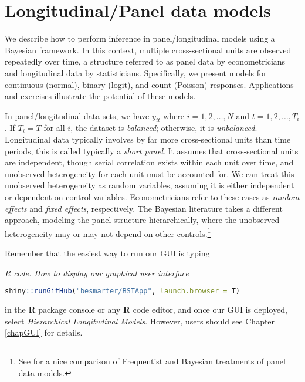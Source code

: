 \chapter{Longitudinal/Panel data models}\label{chap9}

We describe how to perform inference in panel/longitudinal models using a Bayesian framework. In this context, multiple cross-sectional units are observed repeatedly over time, a structure referred to as panel data by econometricians and longitudinal data by statisticians. Specifically, we present models for continuous (normal), binary (logit), and count (Poisson) responses. Applications and exercises illustrate the potential of these models.

In panel/longitudinal data sets, we have $y_{it}$ where $i=1,2,\dots,N$ and $t=1,2,\dots,T_i$. If $T_i=T$ for all $i$, the dataset is \textit{balanced}; otherwise, it is \textit{unbalanced}. Longitudinal data typically involves by far more cross-sectional units than time periods, this is called typically a \textit{short panel}. It assumes that cross-sectional units are independent, though serial correlation exists within each unit over time, and unobserved heterogeneity for each unit must be accounted for. We can treat this unobserved heterogeneity as random variables, assuming it is either independent or dependent on control variables. Econometricians refer to these cases as \textit{random effects} and \textit{fixed effects}, respectively. The Bayesian literature takes a different approach, modeling the panel structure hierarchically, where the unobserved heterogeneity may or may not depend on other controls.\footnote{See \cite{rendon2013fixed} for a nice comparison of Frequentist and Bayesian treatments of panel data models.}

Remember that the easiest way to run our GUI is typing

\begin{tcolorbox}[enhanced,width=4.67in,center upper,
	fontupper=\large\bfseries,drop shadow southwest,sharp corners]
	\textit{R code. How to display our graphical user interface}
	\begin{VF}
	\begin{lstlisting}[language=R]
	shiny::runGitHub("besmarter/BSTApp", launch.browser = T)\end{lstlisting}
	\end{VF}
\end{tcolorbox} 

in the \textbf{R} package console or any \textbf{R} code editor, and once our GUI is deployed, select \textit{Hierarchical Longitudinal Models}. However, users should see Chapter \ref{chapGUI} for details.

